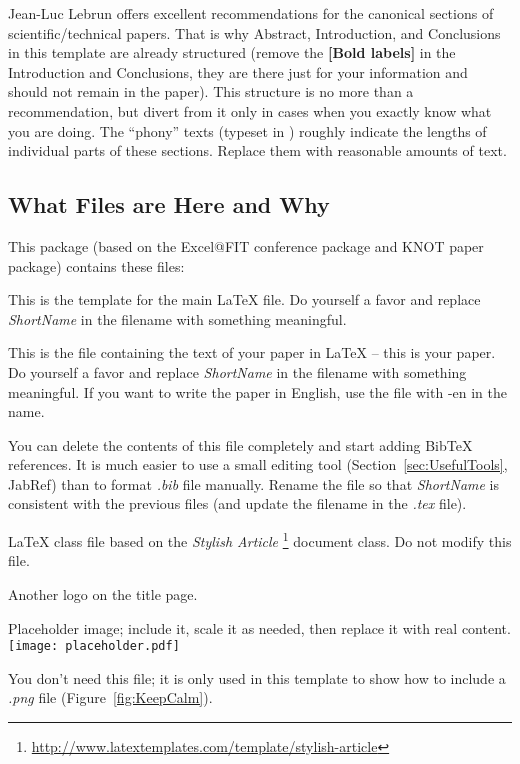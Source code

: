 Jean-Luc Lebrun \cite{Lebrun2011} offers excellent recommendations for the canonical sections of scientific/technical papers.  That is why Abstract, Introduction, and Conclusions in this template are already structured (remove the \textbf{[Bold labels]} in the Introduction and Conclusions, they are there just for your information and should not remain in the paper).  This structure is no more than a recommendation, but divert from it only in cases when you exactly know what you are doing.  The ``phony'' texts (typeset in ) roughly indicate the lengths of individual parts of these sections.  Replace them with reasonable amounts of text.

\subsection{What Files are Here and Why}
\label{sec:FilesInTemplate}

This package (based on the Excel@FIT conference package and KNOT paper package) contains these files:
\begin{description}[noitemsep]
	\item[2019-PPFIT-ShortName.tex] This is the template for the main \LaTeX{} file. Do yourself a favor and replace \textit{ShortName} in the filename with something meaningful.
	\item[2019-PPFIT-ShortName-text(-en).tex] This is the file containing the text of your paper in \LaTeX{} -- this is your paper. Do yourself a favor and replace \textit{ShortName} in the filename with something meaningful. If you want to write the paper in English, use the file with -en in the name.
	\item[2016-KNOTFIT-ShortName-bib.bib] You can delete the contents of this file completely and start adding BibTeX references.  It is much easier to use a small editing tool (Section~\ref{sec:UsefulTools}, JabRef) than to format \textit{.bib} file manually.  Rename the file so that \textit{ShortName} is consistent with the previous files (and update the filename in the \textit{.tex} file).
	\item[PPFIT.cls] \LaTeX{} class file based on the \emph{Stylish Article}%
	  \footnote{\url{http://www.latextemplates.com/template/stylish-article}} document class.  Do not modify this file.
	\item[VUT-FIT-logo.pdf] Another logo on the title page.
	\item[images/placeholder.pdf] Placeholder image; include it, scale it as needed, then replace it with real content.\\ \texttt{[image: placeholder.pdf]}
	\item[images/keep-calm.png] You don't need this file; it is only used in this template to show how to include a \textit{.png} file (Figure~\ref{fig:KeepCalm}).
\end{description}

